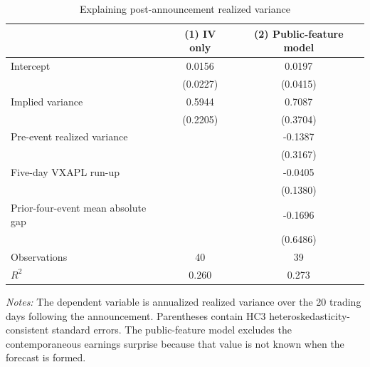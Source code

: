 \begin{table}[!htbp]
\centering
\caption{Explaining post-announcement realized variance}
\label{tab:regression}
\begin{tabular}{lcc}
\toprule
 & (1) IV only & (2) Public-feature model \\
\midrule
Intercept & 0.0156 & 0.0197 \\
 & (0.0227) & (0.0415) \\
Implied variance & 0.5944 & 0.7087 \\
 & (0.2205) & (0.3704) \\
Pre-event realized variance &  & -0.1387 \\
 &  & (0.3167) \\
Five-day VXAPL run-up &  & -0.0405 \\
 &  & (0.1380) \\
Prior-four-event mean absolute gap &  & -0.1696 \\
 &  & (0.6486) \\
\midrule
Observations & 40 & 39 \\
$R^2$ & 0.260 & 0.273 \\
\bottomrule
\end{tabular}
\begin{minipage}{0.92\linewidth}
\footnotesize \textit{Notes:} The dependent variable is annualized realized variance over the 20 trading days following the announcement. Parentheses contain HC3 heteroskedasticity-consistent standard errors. The public-feature model excludes the contemporaneous earnings surprise because that value is not known when the forecast is formed.
\end{minipage}
\end{table}
